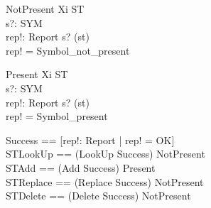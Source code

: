 \begin{schema}{NotPresent}
  Xi ST \\
  s?: SYM \\
  rep!: Report
\where
  s? \notin \dom(st) \\
  rep! = Symbol\_not\_present
\end{schema}

\begin{schema}{Present}
  Xi ST \\
  s?: SYM \\
  rep!: Report
\where
  s? \in \dom(st) \\
  rep! = Symbol\_present
\end{schema}

\begin{zed}
Success == [rep!: Report | rep! = OK] \\
STLookUp == (LookUp \land Success) \lor NotPresent \\
STAdd == (Add \land Success) \lor Present \\
STReplace == (Replace \land Success) \lor NotPresent \\
STDelete == (Delete \land Success) \lor NotPresent
\end{zed}
